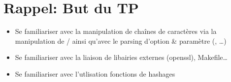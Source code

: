 \section{Rappel: But du TP}
\begin{frame}{\secname \subsecname}

\begin{itemize}
    \item Se familiariser avec la manipulation de chaînes de caractères 
    via la manipulation de / 
    ainsi qu'avec le parsing d'option \& paramètre (,  \ldots) \\
    
    \item Se familiariser avec la liaison de libairies externes (openssl), Makefile\ldots \\
    
    \item Se familiariser avec l'utlisation fonctions de hashages
\end{itemize}

\end{frame}